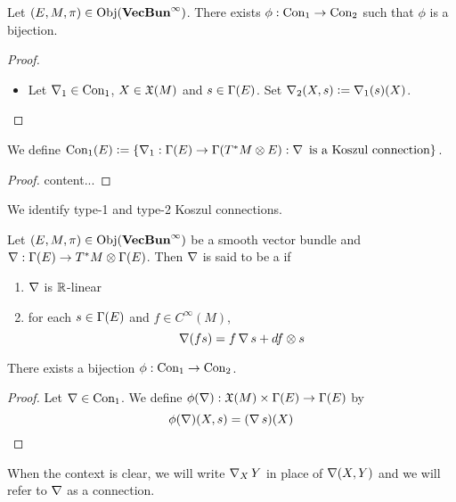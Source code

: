 \documentclass{book}
\begin{document}
	\begin{ex}
		Let $(E, M, \pi) \in \operatorname{Obj}(\operatorname*{\text{\textbf{VecBun}}^{\infty}})$. There exists $\phi: \text{Con}_1 \rightarrow \text{Con}_2$ such that $\phi$ is a bijection. 
	\end{ex}

	\begin{proof}
		\begin{itemize}
			\item Let $\operatorname{\nabla}_1 \in \text{Con}_1$, $X \in \mathfrak{X}(M)$ and $s \in \Gamma(E)$. Set $\operatorname{\nabla}_2(X, s) \vcentcolon= \operatorname{\nabla}_1(s)(X)$. 
		\end{itemize}
	\end{proof}

	\begin{ex}
		We define $\text{Con}_1(E) \vcentcolon= \{\operatorname{\nabla}_1 : \Gamma(E) \rightarrow \Gamma(T^*M \otimes E): \operatorname{\nabla} \text{ is a Koszul connection}\}$.
	\end{ex}

	\begin{proof}
		content...
	\end{proof}

	\begin{note}
		We identify type-1 and type-2 Koszul connections.	
	\end{note}

	\begin{defn}
		Let $(E, M, \pi) \in \operatorname{Obj}(\operatorname*{\text{\textbf{VecBun}}^{\infty}})$ be a smooth vector bundle and $\operatorname{\nabla} : \Gamma(E) \rightarrow T^*M \otimes \Gamma(E)$. Then $\operatorname{\nabla}$ is said to be a  if 
		\begin{enumerate}
			\item $\operatorname{\nabla}$ is $\mathbb{R}$-linear
			\item for each $s \in \Gamma(E)$ and $f \in C^{\infty}(M)$, 
			$$\operatorname{\nabla}(fs) = f \operatorname{\nabla} s + df \otimes s $$ 
		\end{enumerate}
	\end{defn}

	\begin{ex}
		There exists a bijection $\phi:  \text{Con}_1 \rightarrow \text{Con}_2$.
	\end{ex}

	\begin{proof}
		Let $\operatorname{\nabla} \in \text{Con}_1$. We define $\phi(\operatorname{\nabla}): \mathfrak{X}(M) \times \Gamma(E) \rightarrow \Gamma(E)$ by $$\phi(\operatorname{\nabla})(X, s) = (\operatorname{\nabla} s)(X)$$
	\end{proof}

	\begin{note}
		When the context is clear, we will write $\operatorname{\nabla}_X Y$ in place of $\operatorname{\nabla}(X,Y)$ and we will refer to $\operatorname{\nabla}$ as a connection.
	\end{note}
\end{document}
